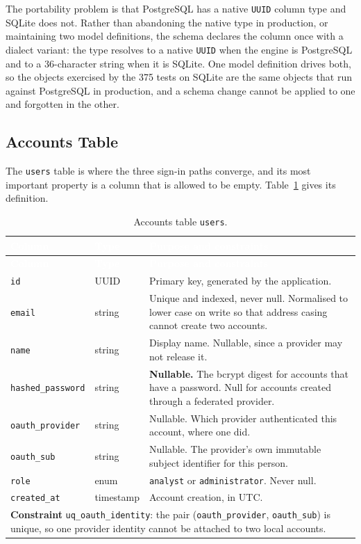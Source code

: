 The portability problem is that PostgreSQL has a native \texttt{UUID} column type and SQLite
does not. Rather than abandoning the native type in production, or maintaining two model
definitions, the schema declares the column once with a dialect variant: the type resolves to
a native \texttt{UUID} when the engine is PostgreSQL and to a 36-character string when it is
SQLite. One model definition drives both, so the objects exercised by the 375 tests on SQLite
are the same objects that run against PostgreSQL in production, and a schema change cannot
be applied to one and forgotten in the other.

\subsection{Accounts Table}

The \texttt{users} table is where the three sign-in paths converge, and its most important
property is a column that is allowed to be empty. Table~\ref{tab:usersschema} gives its
definition.

\begin{longtable}{|p{}|p{}|p{}|}
\caption{Accounts table \texttt{users}.}\label{tab:usersschema}\\
\hline
\rowcolor{myblue}\textcolor{white}{\textbf{Column}} & \textcolor{white}{\textbf{Type}} & \textcolor{white}{\textbf{Purpose and constraints}} \\
\hline
\endfirsthead
\hline
\rowcolor{myblue}\textcolor{white}{\textbf{Column}} & \textcolor{white}{\textbf{Type}} & \textcolor{white}{\textbf{Purpose and constraints}} \\
\hline
\endhead
\texttt{id} & UUID & Primary key, generated by the application. \\ \hline
\texttt{email} & string & Unique and indexed, never null. Normalised to lower case on write so that address casing cannot create two accounts. \\ \hline
\texttt{name} & string & Display name. Nullable, since a provider may not release it. \\ \hline
\texttt{hashed\_password} & string & \textbf{Nullable.} The bcrypt digest for accounts that have a password. Null for accounts created through a federated provider. \\ \hline
\texttt{oauth\_provider} & string & Nullable. Which provider authenticated this account, where one did. \\ \hline
\texttt{oauth\_sub} & string & Nullable. The provider's own immutable subject identifier for this person. \\ \hline
\texttt{role} & enum & \texttt{analyst} or \texttt{administrator}. Never null. \\ \hline
\texttt{created\_at} & timestamp & Account creation, in UTC. \\ \hline
\multicolumn{3}{|p{0.92\textwidth}|}{\textbf{Constraint} \texttt{uq\_oauth\_identity}: the pair (\texttt{oauth\_provider}, \texttt{oauth\_sub}) is unique, so one provider identity cannot be attached to two local accounts.} \\ \hline
\end{longtable}

